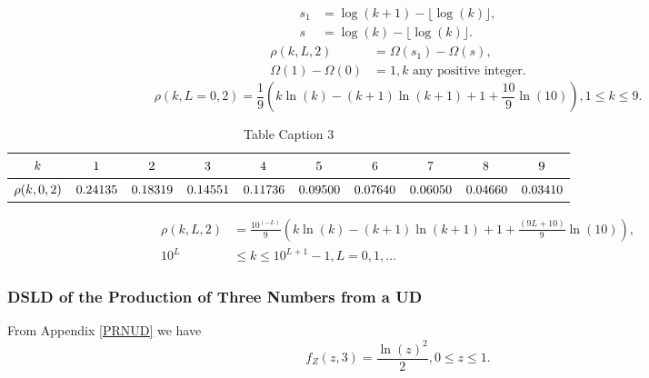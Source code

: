 \documentclass[titlepage,fleqn]{article}%
\begin{document}
\begin{align*}
s_{1}  &  =\log(k+1)-\lfloor\log(k)\rfloor,\\
s  &  =\log(k)-\lfloor\log(k)\rfloor.
\end{align*}%
\begin{align*}
\rho(k,L,2)  &  =\Omega(s_{1})-\Omega(s),\\
\Omega(1)-\Omega(0)  &  =1,k\text{ \ any positive integer.}%
\end{align*}%
\begin{equation}
\rho(k,L=0,2)=\frac{1}{9}\left(  k\ln(k)-(k+1)\ln(k+1)+1+\frac{10}{9}%
\ln(10)\right)  ,1\leq k\leq9. \label{Prod1}%
\end{equation}%
\begin{table}[!htbp] \centering
\begin{tabular}
[c]{|c|c|c|c|c|c|c|c|c|c|}\hline\hline
${\small k}$ & ${\small 1}$ & ${\small 2}$ & ${\small 3}$ & ${\small 4}$ &
${\small 5}$ & ${\small 6}$ & ${\small 7}$ & ${\small 8}$ & ${\small 9}%
$\\\hline
${\small \rho(k,0,2)}$ & ${\small 0.24135}$ & ${\small 0.18319}$ &
${\small 0.14551}$ & ${\small 0.11736}$ & ${\small 0.09500}$ &
${\small 0.07640}$ & ${\small 0.06050}$ & ${\small 0.04660}$ &
${\small 0.03410}$\\\hline\hline
\end{tabular}
\caption{Table Caption 3}\label{TableKey3}%
\end{table}%
\begin{align}
\rho(k,L,2)  &  =\frac{10^{\left(  -L\right)  }}{9}\left(  k\ln(k)-(k+1)\ln
(k+1)+1+\frac{\left(  9L+10\right)  }{9}\ln(10)\right)  ,\label{Prod2}\\
10^{L}  &  \leq k\leq10^{L+1}-1,L=0,1,\ldots\nonumber
\end{align}


\subsubsection{DSLD of the Production of Three Numbers from a UD}%

\label{Pro3}%


From Appendix
\ref{PRNUD}
we have
\[
f_{Z}(z,3)=\frac{\ln(z)^{2}}{2},0\leq z\leq1.
\]
%
\end{document}
